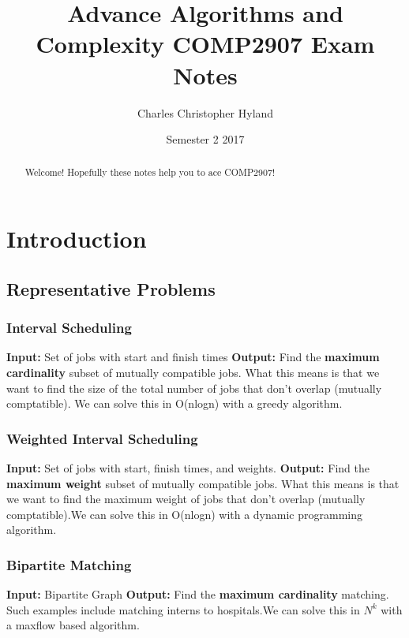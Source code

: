 \documentclass[11pt, oneside]{article}
\title{Advance Algorithms and Complexity COMP2907 Exam Notes}
\author{Charles Christopher Hyland}
\date{Semester 2 2017}
\theoremstyle{definition}
\begin{document}
\maketitle
\begin{abstract}
Welcome! Hopefully these notes help you to ace COMP2907!
\end{abstract}
\newpage
\tableofcontents
\newpage
{}
\makeatletter
\def\BState{\State\hskip-\ALG@thistlm}
\makeatother
\section{Introduction}

\subsection{Representative Problems}
\subsubsection{Interval Scheduling}
\textbf{Input: }Set of jobs with start and finish times
\newline
\textbf{Output: } Find the \textbf{maximum cardinality} subset of mutually compatible jobs. What this means is that we want to find the size of the total number of jobs that don't overlap (mutually comptatible). We can solve this in O(nlogn) with a greedy algorithm.

\subsubsection{Weighted Interval Scheduling}
\textbf{Input: }Set of jobs with start, finish times, and weights.
\newline
\textbf{Output: } Find the \textbf{maximum weight} subset of mutually compatible jobs. What this means is that we want to find the maximum weight of jobs that don't overlap (mutually comptatible).We can solve this in O(nlogn) with a dynamic programming algorithm.

\subsubsection{Bipartite Matching}
\textbf{Input: }Bipartite Graph
\newline
\textbf{Output: } Find the \textbf{maximum cardinality} matching. Such examples include matching interns to hospitals.We can solve this in $N^k$ with a maxflow based algorithm.
\end{document}
